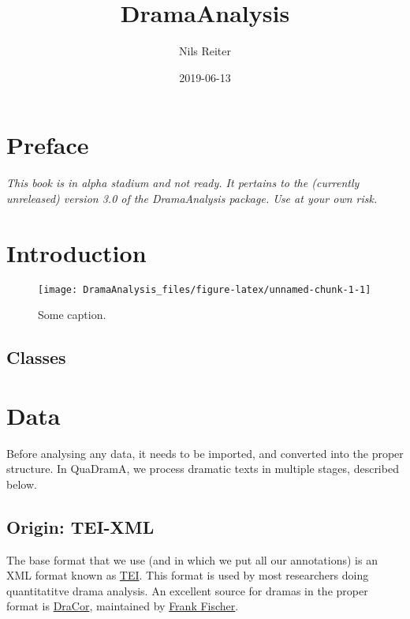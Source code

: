 \documentclass[]{book}
\title{DramaAnalysis}
\author{Nils Reiter}
\date{2019-06-13}
\begin{document}
\maketitle

{
\setcounter{tocdepth}{1}
\tableofcontents
}
\hypertarget{preface}{%
\chapter*{Preface}\label{preface}}

\emph{This book is in alpha stadium and not ready. It pertains to the (currently unreleased) version 3.0 of the DramaAnalysis package. Use at your own risk.}

\hypertarget{introduction}{%
\chapter{Introduction}\label{introduction}}

\begin{figure}
\texttt{[image: DramaAnalysis\_files/figure-latex/unnamed-chunk-1-1]} \caption{Some caption.}\label{fig:unnamed-chunk-1}
\end{figure}

\hypertarget{classes}{%
\section{Classes}\label{classes}}

\hypertarget{data}{%
\chapter{Data}\label{data}}

Before analysing any data, it needs to be imported, and converted into the proper structure. In QuaDramA, we process dramatic texts in multiple stages, described below.

\hypertarget{origin-tei-xml}{%
\section{Origin: TEI-XML}\label{origin-tei-xml}}

The base format that we use (and in which we put all our annotations) is an XML format known as \href{https://tei-c.org}{TEI}. This format is used by most researchers doing quantitatitve drama analysis. An excellent source for dramas in the proper format is \href{https://github.com/dracor-org/}{DraCor}, maintained by \href{https://www.hse.ru/en/org/persons/182492735}{Frank Fischer}.
\end{document}
